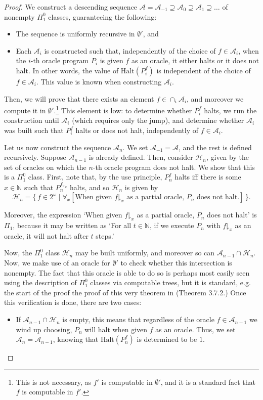 \documentclass{article}
\theoremstyle{nonumberplain}
\newtheorem{proof}{Proof}
\newcommand{\N}{\mathbb{N}}
\newcommand{\halt}{\mathrm{Halt}}
\newcommand{\cl}[1]{\mathcal{#1}}
\newcommand{\take}[2]{#1\mathord{\downharpoonright}_{#2}}
\begin{document}
\begin{proof}
We construct a descending sequence $\cl A = \cl A_{-1} \supseteq \cl A_0 \supseteq \cl A_1 \supseteq \dots$ of nonempty $\Pi^0_1$ classes, guaranteeing the following:
\begin{itemize}
\item The sequence is uniformly recursive in $\emptyset'$, and
\item Each $\cl A_i$ is constructed such that, independently of the choice of $f \in \cl A_i$, when the $i$-th oracle program $P_i$ is given $f$ as an oracle, it either halts or it does not halt. In other words, the value of $\halt(P_i^f)$ is independent of the choice of $f \in \cl A_i$. This value is known when constructing $\cl A_i$.
\end{itemize}

Then, we will prove that there exists an element $f \in \cap_i \cl A_i$, and moreover we compute it in $\emptyset'$.\footnote{This is not necessary, as $f'$ is computable in $\emptyset'$, and it is a standard fact that $f$ is computable in $f'$.} This element is low: to determine whether $P_i^f$ halts, we run the construction until $\cl A_i$ (which requires only the jump), and determine whether $\cl A_i$ was built such that $P_i^f$ halts or does not halt, independently of $f \in \cl A_i$.

Let us now construct the sequence $\cl A_n$. We set $\cl A_{-1} = \cl A$, and the rest is defined recursively. Suppose $\cl A_{n-1}$ is already defined. Then, consider $\cl H_n$, given by the set of oracles on which the $n$-th oracle program does not halt. We show that this is a $\Pi^0_1$ class. First, note that, by the use principle, $P_n^f$ halts iff there is some $x \in \N$ such that $P_n^{\take f x}$ halts, and so $\cl H_n$ is given by
\begin{equation}
\cl H_n = \{\, f \in 2^\omega \mid \forall_x [\text{When given $\take f x$ as a partial oracle, $P_n$ does not halt.}] \,\}.
\end{equation}

Moreover, the expression `When given $\take f x$ as a partial oracle, $P_n$ does not halt' is $\Pi_1$, because it may be written as `For all $t \in \N$, if we execute $P_n$ with $\take f x$ as an oracle, it will not halt after $t$ steps.'

Now, the $\Pi^0_1$ class $\cl H_n$ may be built uniformly, and moreover so can $\cl A_{n-1} \cap \cl H_n$. Now, we make use of an oracle for $\emptyset'$ to check whether this intersection is nonempty. The fact that this oracle is able to do so is perhaps most easily seen using the description of $\Pi^0_1$ classes via computable trees, but it is standard, e.g. the start of the proof the proof of this very theorem in \cite{soare2} (Theorem 3.7.2.) Once this verification is done, there are two cases:
\begin{itemize}
\item If $\cl A_{n-1} \cap \cl H_n$ is empty, this means that regardless of the oracle $f \in \cl A_{n-1}$ we wind up choosing, $P_n$ will halt when given $f$ as an oracle. Thus, we set $\cl A_n = \cl A_{n-1}$, knowing that $\halt(P_n^f)$ is determined to be $1$.


\end{itemize}
\end{proof}
\end{document}
